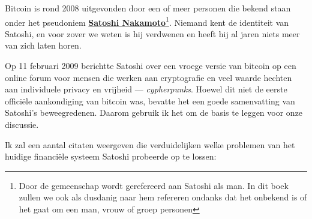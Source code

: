 \documentclass[
  letterpaper,
]{scrbook}
\begin{document}
Bitcoin is rond 2008 uitgevonden door een of meer personen die bekend
staan onder het pseudoniem
\href{https://nl.wikipedia.org/wiki/Satoshi_Nakamoto}{\textbf{Satoshi
Nakamoto}}\footnote{Door de gemeenschap wordt gerefereerd aan Satoshi
  als man. In dit boek zullen we ook als dusdanig naar hem refereren
  ondanks dat het onbekend is of het gaat om een man, vrouw of groep
  personen}. Niemand kent de identiteit van Satoshi, en voor zover we
weten is hij verdwenen en heeft hij al jaren niets meer van zich laten
horen.

Op 11 februari 2009 berichtte Satoshi over een vroege versie van bitcoin
op een online forum voor mensen die werken aan cryptografie en veel
waarde hechten aan individuele privacy en vrijheid ---
\emph{cypherpunks}. Hoewel dit niet de eerste officiële aankondiging van
bitcoin was, bevatte het een goede samenvatting van Satoshi's
beweegredenen. Daarom gebruik ik het om de basis te leggen voor onze
discussie.

Ik zal een aantal citaten weergeven die verduidelijken welke problemen
van het huidige financiële systeem Satoshi probeerde op te lossen:
\end{document}
